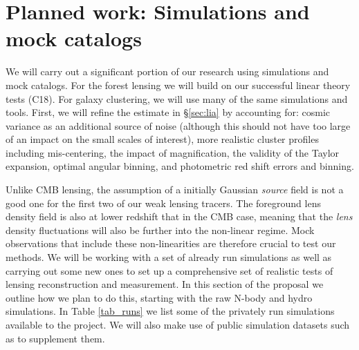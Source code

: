 \section{Planned work: Simulations and mock catalogs}\label{sec:sim}

We will carry out a significant portion of our research using
 simulations and mock catalogs.
For the forest lensing we will build on our successful
linear theory tests (C18). For galaxy clustering,
we will use many of the same simulations and tools. 
First, we will refine the estimate 
in \S\ref{sec:lia} by accounting for: cosmic variance as an
additional source of noise (although this should not have too large
of an impact on the small scales of interest), more realistic cluster
profiles including mis-centering, the impact of magnification, the
validity of the Taylor expansion, optimal angular binning, and
photometric red shift errors and binning.



Unlike CMB lensing, the assumption of a initially Gaussian {\it source}
field is not a good one for the first two of our weak lensing tracers. 
The foreground lens density field is also
at lower redshift that in the CMB case, meaning that the {\it lens}
density fluctuations will also be further into the non-linear regime. Mock
observations that include these non-linearities are therefore crucial
to test our methods. We will be working with a set of already run simulations
as well as carrying out some new ones to set up a comprehensive set
of realistic tests of lensing reconstruction and measurement. In this
section of the proposal we outline  how we plan to do this, starting
with the raw N-body and hydro simulations. In Table \ref{tab_runs} we list
some of the privately run simulations available to the project. We will
also make use of public simulation datasets such as \cite{giocoli2016}
 to supplement them.




